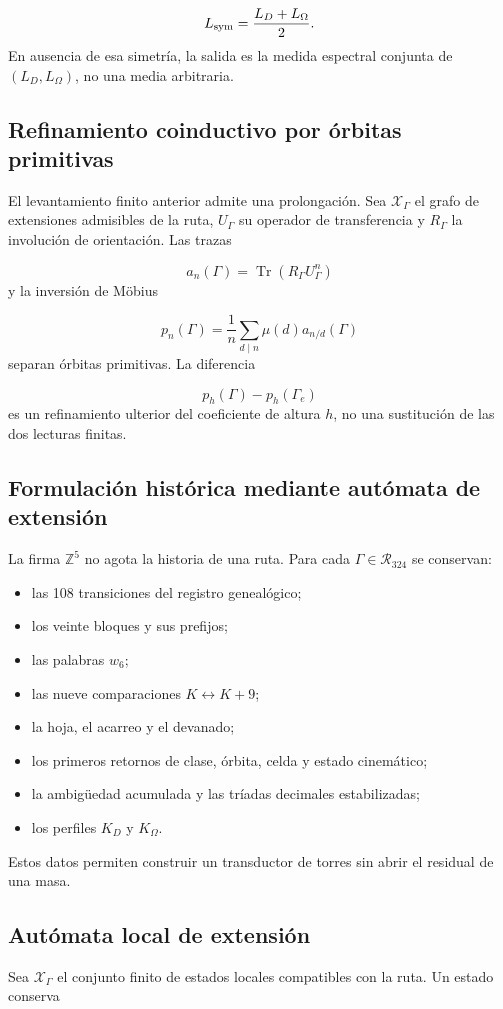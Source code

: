 \[
 L_{\rm sym}=\frac{L_D+L_\Omega}{2}.
\]
En ausencia de esa simetría, la salida es la medida espectral conjunta de \((L_D,L_\Omega)\), no una media arbitraria.

\subsection{Refinamiento coinductivo por órbitas primitivas}
El levantamiento finito anterior admite una prolongación. Sea \(\mathscr X_\Gamma\) el grafo de extensiones admisibles de la ruta, \(U_\Gamma\) su operador de transferencia y \(R_\Gamma\) la involución de orientación. Las trazas

\[
 a_n(\Gamma)=\operatorname{Tr}(R_\Gamma U_\Gamma^n)
\]
y la inversión de Möbius

\[
 p_n(\Gamma)=\frac1n\sum_{d\mid n}\mu(d)a_{n/d}(\Gamma)
\]
separan órbitas primitivas. La diferencia

\[
 p_h(\Gamma)-p_h(\Gamma_e)
\]
es un refinamiento ulterior del coeficiente de altura \(h\), no una sustitución de las dos lecturas finitas.

\subsection{Formulación histórica mediante autómata de extensión}
La firma \(\mathbb Z^5\) no agota la historia de una ruta. Para cada \(\Gamma\in\mathcal R_{324}\) se conservan:

\begin{itemize}
\item las 108 transiciones del registro genealógico;
\item los veinte bloques y sus prefijos;
\item las palabras \(w_6\);
\item las nueve comparaciones \(K\leftrightarrow K+9\);
\item la hoja, el acarreo y el devanado;
\item los primeros retornos de clase, órbita, celda y estado cinemático;
\item la ambigüedad acumulada y las tríadas decimales estabilizadas;
\item los perfiles \(K_D\) y \(K_\Omega\).
\end{itemize}
Estos datos permiten construir un transductor de torres sin abrir el residual de una masa.

\subsection{Autómata local de extensión}
Sea \(\mathscr X_\Gamma\) el conjunto finito de estados locales compatibles con la ruta. Un estado conserva

